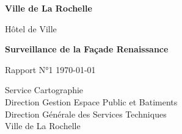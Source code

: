 


\begin{titlepage}
  \begin{center}
    \vspace*{1cm}

    \Huge
    \textbf{Ville de La Rochelle}

    \vspace{0.5cm}
    \LARGE
    Hôtel de Ville

    \vspace{1.5cm}

    \textbf{Surveillance de la Façade Renaissance}

    \vfill

    Rapport N°1
    \today

    \vspace{0.8cm}


    \Large
    Service Cartographie\\
    Direction Gestion Espace Public et Batiments\\
    Direction Générale des Services Techniques\\
    Ville de La Rochelle\\

  \end{center}
\end{titlepage}


